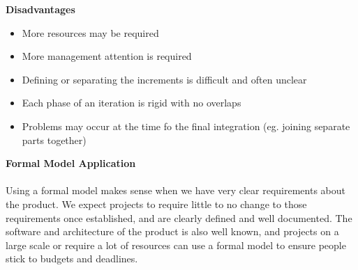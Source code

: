 \documentclass[a4paper,10pt]{article}
\begin{document}
\textbf{Disadvantages}
\begin{itemize}
	\item More resources may be required 
	\item More management attention is required 
	\item Defining or separating the increments is difficult and often unclear 
	\item Each phase of an iteration is rigid with no overlaps 
	\item Problems may occur at the time fo the final integration (eg. joining separate parts together)\\
\end{itemize}
\textcolor{BlueGreen}{\textbf{Formal Model Application}} \\\\
Using a formal model makes sense when we have very clear requirements about the product. We expect projects to require little to no change to those requirements once established, and are clearly defined and well documented. The software and architecture of the product is also well known, and projects on a large scale or require a lot of resources can use a formal model to ensure people stick to budgets and deadlines. 
\newpage 
\end{document}
